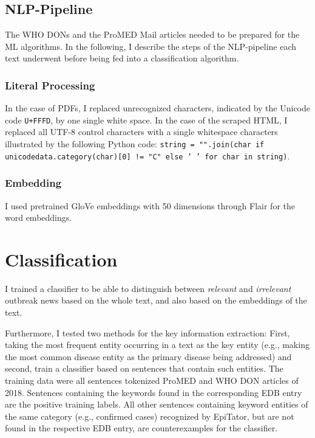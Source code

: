 \subsection{NLP-Pipeline}
  The WHO DONs and the ProMED Mail articles needed to be prepared for the ML algorithms.
  In the following, I describe the steps of the NLP-pipeline each text underwent before being fed into a classification algorithm.

\subsubsection{Literal Processing}
  In the case of PDFs, I replaced unrecognized characters, indicated by the Unicode code \texttt{U+FFFD}, by one single white space.
  In the case of the scraped HTML, I replaced all UTF-8 control characters with a single whitespace characters illustrated by the following Python code: \texttt{string = "".join(char if unicodedata.category(char)[0] != "C" else ' ' for char in string)}.

\subsubsection{Embedding}
  I used pretrained GloVe embeddings with 50 dimensions through Flair for the word embeddings.

\section{Classification}
  I trained a classifier to be able to distinguish between \textsl{relevant} and \textsl{irrelevant} outbreak news based on the whole text, and also based on the embeddings of the text.

  Furthermore, I tested two methods for the key information extraction: First, taking the most frequent entity occurring in a text as the key entity (e.g., making the most common disease entity as the primary disease being addressed) and second, train a classifier based on sentences that contain such entities. The training data were all sentences tokenized ProMED and WHO DON articles of 2018.
  Sentences containing the keywords found in the corresponding EDB entry are the positive training labels.
  All other sentences containing keyword entities of the same category (e.g., confirmed cases) recognized by EpiTator, but are not found in the respective EDB entry, are counterexamples for the classifier.

